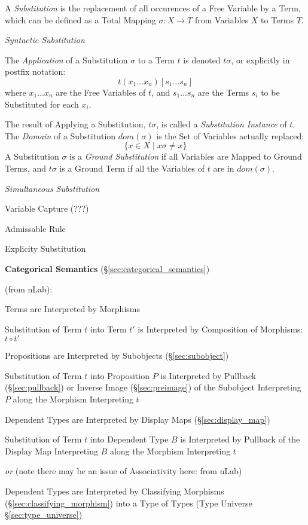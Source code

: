 A \emph{Substitution} is the replacement of all occurences of a Free
Variable by a Term, which can be defined as a Total Mapping $\sigma: X
\rightarrow T$ from Variables $X$ to Terms $T$.

\emph{Syntactic Substitution}

The \emph{Application} of a Substitution $\sigma$ to a Term $t$ is
denoted $t\sigma$, or explicitly in postfix notation:
\[
  t(x_1 \ldots x_n)[s_1 \ldots s_n]
\]
where $x_1 \ldots x_n$ are the Free Variables of $t$, and $s_1 \ldots
s_n$ are the Terms $s_i$ to be Substituted for each $x_i$.

The result of Applying a Substitution, $t\sigma$, is called a
\emph{Substitution Instance} of $t$. The \emph{Domain} of a
Substitution $dom(\sigma)$ is the Set of Variables actually replaced:
\[
  \{ x \in X \;|\; x\sigma \neq x \}
\]
A Substitution $\sigma$ is a \emph{Ground Substitution} if all
Variables are Mapped to Ground Terms, and $t\sigma$ is a Ground Term
if all the Variables of $t$ are in $dom(\sigma)$.

\emph{Simultaneous Substitution}

Variable Capture (???)

Admissable Rule

Explicity Substitution


\textbf{Categorical Semantics} (\S\ref{sec:categorical_semantics})

(from nLab): %

Terms are Interpreted by Morphisms

Substitution of Term $t$ into Term $t'$ is Interpreted by Composition
of Morphisms: $t \circ t'$

Propositions are Interpreted by Subobjects (\S\ref{sec:subobject})

Substitution of Term $t$ into Proposition $P$ is Interpreted by
Pullback (\S\ref{sec:pullback}) or Inverse Image
(\S\ref{sec:preimage}) of the Subobject Interpreting $P$ along the
Morphism Interpreting $t$

Dependent Types are Interpreted by Display Maps
(\S\ref{sec:display_map})

Substitution of Term $t$ into Dependent Type $B$ is Interpreted by
Pullback of the Display Map Interpreting $B$ along the Morphism
Interpreting $t$

\emph{or} (note there may be an issue of Associativity here: from nLab)

Dependent Types are Interpreted by Classifying Morphisms
(\S\ref{sec:classifying_morphism}) into a Type of Types (Type Universe
\S\ref{sec:type_universe})

